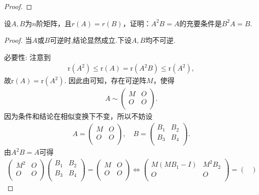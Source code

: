 \documentclass[../../main.tex]{subfiles}
\begin{document}
\begin{proof}
\end{proof}

\begin{example}
设$A,B$为$n$阶矩阵，且$r(A)=r(B)$，证明：$A^2B = A$的充要条件是$B^2A = B$.
\end{example}
\begin{proof}
当$A$或$B$可逆时,结论显然成立.下设$A,B$均不可逆.

{\heiti 必要性:} 注意到
\begin{align*}
\mathrm{r}(A^2) \leqslant \mathrm{r}(A) = \mathrm{r}(A^2B) \leqslant \mathrm{r}(A^2),
\end{align*}
故\(\mathrm{r}(A) = \mathrm{r}(A^2)\). 因此由可知，存在可逆阵\(M\)，使得
\begin{align*}
A \sim \begin{pmatrix}
M&		O\\
O&		O\\
\end{pmatrix}.
\end{align*}
因为条件和结论在相似变换下不变，所以不妨设
\begin{align*}
A = \begin{pmatrix}
M&		O\\
O&		O\\
\end{pmatrix},\quad B = \begin{pmatrix}
B_1&		B_2\\
B_3&		B_4\\
\end{pmatrix}.
\end{align*}
由\(A^2B = A\)可得
\begin{align*}
\begin{pmatrix}
M^2&		O\\
O&		O\\
\end{pmatrix} \begin{pmatrix}
B_1&		B_2\\
B_3&		B_4\\
\end{pmatrix} = \begin{pmatrix}
M&		O\\
O&		O\\
\end{pmatrix} \Longleftrightarrow \begin{pmatrix}
M(MB_1 - I)&		M^2B_2\\
O&		O\\
\end{pmatrix} = \begin{pmatrix}

\end{pmatrix}
\end{align*}
\end{proof}
\end{document}
